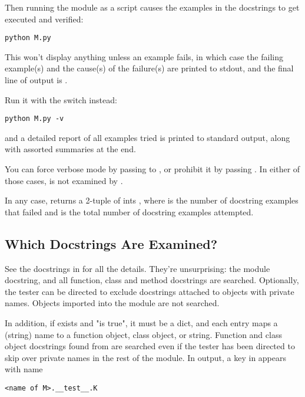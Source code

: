 Then running the module as a script causes the examples in the docstrings
to get executed and verified:

\begin{verbatim}
python M.py
\end{verbatim}

This won't display anything unless an example fails, in which case the
failing example(s) and the cause(s) of the failure(s) are printed to stdout,
and the final line of output is .

Run it with the  switch instead:

\begin{verbatim}
python M.py -v
\end{verbatim}

and a detailed report of all examples tried is printed to standard
output, along with assorted summaries at the end.

You can force verbose mode by passing  to
, or
prohibit it by passing .  In either of those cases,
 is not examined by .

In any case,  returns a 2-tuple of ints , where  is the number of docstring examples that
failed and  is the total number of docstring examples
attempted.

\subsection{Which Docstrings Are Examined?}

See the docstrings in  for all the details.  They're
unsurprising: the module docstring, and all function, class and method
docstrings are searched.  Optionally, the tester can be directed to
exclude docstrings attached to objects with private names.  Objects
imported into the module are not searched.

In addition, if  exists and "is true", it must be a
dict, and each entry maps a (string) name to a function object, class
object, or string.  Function and class object docstrings found from
 are searched even if the tester has been
directed to skip over private names in the rest of the module.
In output, a key  in  appears with name

\begin{verbatim}
<name of M>.__test__.K
\end{verbatim}

